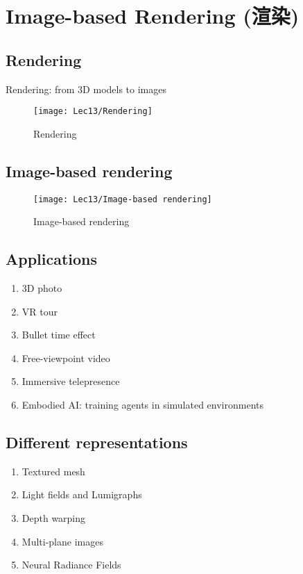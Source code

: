 \section{Image-based Rendering (渲染)}
\subsection{Rendering}
Rendering: from 3D models to images

\begin{figure}[H]
    \centering
    \texttt{[image: Lec13/Rendering]}
    \caption{Rendering}
\end{figure}

\subsection{Image-based rendering}

\begin{figure}[H]
    \centering
    \texttt{[image: Lec13/Image-based rendering]}
    \caption{Image-based rendering}
\end{figure}

\subsection{Applications}
\begin{enumerate}
    \item 3D photo
    \item VR tour
    \item Bullet time effect
    \item Free-viewpoint video
    \item Immersive telepresence
    \item Embodied AI: training agents in simulated environments
\end{enumerate}

\subsection{Different representations}
\begin{enumerate}
    \item Textured mesh
    \item Light fields and Lumigraphs
    \item Depth warping
    \item Multi-plane images
    \item Neural Radiance Fields
\end{enumerate}

